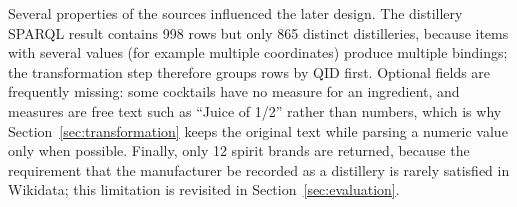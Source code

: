 Several properties of the sources influenced the later design. The distillery
SPARQL result contains 998 rows but only 865 distinct distilleries, because
items with several values (for example multiple coordinates) produce multiple
bindings; the transformation step therefore groups rows by QID first. Optional
fields are frequently missing: some cocktails have no measure for an
ingredient, and measures are free text such as ``Juice of 1/2'' rather than
numbers, which is why Section~\ref{sec:transformation} keeps the original text while parsing a numeric
value only when possible. Finally, only 12 spirit brands are returned, because
the requirement that the manufacturer be recorded as a distillery is rarely
satisfied in Wikidata; this limitation is revisited in Section~\ref{sec:evaluation}.
